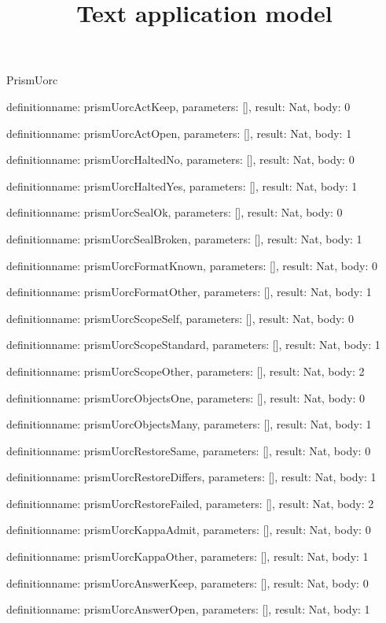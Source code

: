 \begin{lexlean}{PrismUorc}
\title{Text application model}
\begin{semanticmodule}
definition{name: prismUorcActKeep, parameters: [], result: Nat, body: 0}

definition{name: prismUorcActOpen, parameters: [], result: Nat, body: 1}

definition{name: prismUorcHaltedNo, parameters: [], result: Nat, body: 0}

definition{name: prismUorcHaltedYes, parameters: [], result: Nat, body: 1}

definition{name: prismUorcSealOk, parameters: [], result: Nat, body: 0}

definition{name: prismUorcSealBroken, parameters: [], result: Nat, body: 1}

definition{name: prismUorcFormatKnown, parameters: [], result: Nat, body: 0}

definition{name: prismUorcFormatOther, parameters: [], result: Nat, body: 1}

definition{name: prismUorcScopeSelf, parameters: [], result: Nat, body: 0}

definition{name: prismUorcScopeStandard, parameters: [], result: Nat, body: 1}

definition{name: prismUorcScopeOther, parameters: [], result: Nat, body: 2}

definition{name: prismUorcObjectsOne, parameters: [], result: Nat, body: 0}

definition{name: prismUorcObjectsMany, parameters: [], result: Nat, body: 1}

definition{name: prismUorcRestoreSame, parameters: [], result: Nat, body: 0}

definition{name: prismUorcRestoreDiffers, parameters: [], result: Nat, body: 1}

definition{name: prismUorcRestoreFailed, parameters: [], result: Nat, body: 2}

definition{name: prismUorcKappaAdmit, parameters: [], result: Nat, body: 0}

definition{name: prismUorcKappaOther, parameters: [], result: Nat, body: 1}

definition{name: prismUorcAnswerKeep, parameters: [], result: Nat, body: 0}

definition{name: prismUorcAnswerOpen, parameters: [], result: Nat, body: 1}


\end{semanticmodule}
\end{lexlean}
